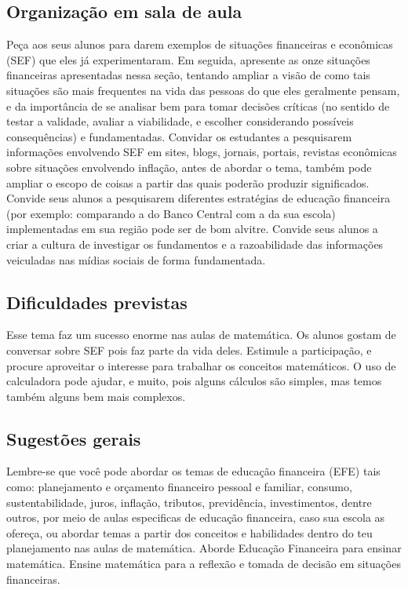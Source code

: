 \clearmargin
\begin{texto}
{
  \subsection{Organização em sala de aula} Peça aos seus alunos para darem exemplos de situações financeiras e econômicas (SEF) que eles já experimentaram. Em seguida, apresente as onze situações financeiras apresentadas nessa seção, tentando ampliar a visão de como tais situações são mais frequentes na vida das pessoas do que eles geralmente pensam, e da importância de se analisar bem para tomar decisões críticas (no sentido de testar a validade, avaliar a viabilidade, e escolher considerando possíveis consequências) e fundamentadas. Convidar os estudantes a pesquisarem informações envolvendo SEF em sites, blogs, jornais, portais, revistas econômicas sobre situações envolvendo inflação, antes de abordar o tema, também pode ampliar o escopo de coisas a partir das quais poderão produzir significados. Convide seus alunos a pesquisarem diferentes estratégias de educação financeira (por exemplo: comparando a do Banco Central com a da sua escola) implementadas em sua região pode ser de bom alvitre. Convide seus alunos a criar a cultura de investigar os fundamentos e a razoabilidade das informações veiculadas nas mídias sociais de forma fundamentada.

  \subsection{Dificuldades previstas} Esse tema faz um sucesso enorme nas aulas de matemática. Os alunos gostam de conversar sobre SEF pois faz parte da vida deles. Estimule a participação, e procure aproveitar o interesse para trabalhar os conceitos matemáticos. O uso de calculadora pode ajudar, e muito, pois alguns cálculos são simples, mas temos também alguns bem mais complexos. 

  \subsection{Sugestões gerais} Lembre-se que você pode abordar os temas de educação financeira (EFE) tais como: planejamento e orçamento financeiro pessoal e familiar, consumo, sustentabilidade, juros, inflação, tributos, previdência, investimentos, dentre outros, por meio de aulas especificas de educação financeira, caso sua escola as ofereça, ou abordar temas a partir dos conceitos e habilidades dentro do teu planejamento nas aulas de matemática. Aborde Educação Financeira para ensinar matemática. Ensine matemática para a reflexão e tomada de decisão em situações financeiras.
}
\end{texto}

